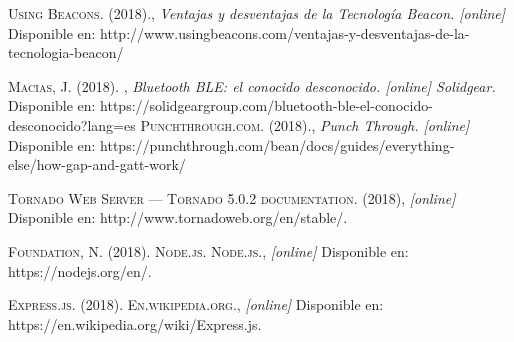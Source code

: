 \begin{thebibliography}{}
 \textsc{Using Beacons. (2018).}, 
\textit{Ventajas y desventajas de la Tecnología Beacon. [online]}
Disponible en: http://www.usingbeacons.com/ventajas-y-desventajas-de-la-tecnologia-beacon/ 

 \textsc{Macias, J. (2018). }, 
\textit{Bluetooth BLE: el conocido desconocido. [online] Solidgear.}
Disponible en:  https://solidgeargroup.com/bluetooth-ble-el-conocido-desconocido?lang=es 
 \textsc{Punchthrough.com. (2018).}, 
\textit{Punch Through. [online]}
Disponible en: https://punchthrough.com/bean/docs/guides/everything-else/how-gap-and-gatt-work/ 

 \textsc{Tornado Web Server — Tornado 5.0.2 documentation. (2018)}, 
\textit{[online]}
Disponible en: http://www.tornadoweb.org/en/stable/.

 \textsc{Foundation, N. (2018). Node.js. Node.js.}, 
\textit{[online]}
Disponible en: https://nodejs.org/en/.


 \textsc{Express.js. (2018). En.wikipedia.org.}, 
\textit{[online]}
Disponible en: https://en.wikipedia.org/wiki/Express.js.

\end{thebibliography}